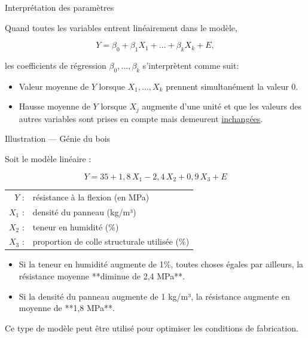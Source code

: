 \documentclass{BeamerTemplate}
\begin{document}
\begin{frame}[t]{Interprétation des paramètres}

{\small
Quand toutes les variables entrent linéairement dans le modèle,

$$Y=\beta_0+\beta_1X_1+...+\beta_kX_k+E,$$

les coefficients de régression $\beta_0,\ldots,\beta_k$ s'interprètent comme suit:
\bigskip

\begin{itemize}\itemsep1cm
\item[$\beta_0$: ] Valeur \alert{moyenne} de $Y$ lorsque $X_1,\ldots,X_k$ prennent \alert{simultanément} la valeur 0.
\item[$\beta_j$: ] Hausse \alert{moyenne} de $Y$ lorsque $X_j$ augmente d'une unité et que les
valeurs des autres variables sont prises en compte mais demeurent \underline{inchangées}.
\end{itemize}
}
\end{frame}



\begin{frame}[t]{Illustration — Génie du bois}

Soit le modèle linéaire :

$$
Y = 35 + 1{,}8\,X_1 - 2{,}4\,X_2 + 0{,}9\,X_3 + E
$$

\vspace{0.4cm}

\begin{tabular}{rl}
$Y$ : & résistance à la flexion (en MPa) \\
$X_1$ : & densité du panneau (kg/m³) \\
$X_2$ : & teneur en humidité (\%) \\
$X_3$ : & proportion de colle structurale utilisée (\%)
\end{tabular}

\vspace{0.4cm}

\begin{itemize}
\item Si la teneur en humidité augmente de 1\%, toutes choses égales par ailleurs, la résistance moyenne **diminue de 2,4 MPa**.
\item Si la densité du panneau augmente de 1 kg/m³, la résistance augmente en moyenne de **1,8 MPa**.
\end{itemize}

\vspace{0.3cm}
{\tiny Ce type de modèle peut être utilisé pour optimiser les conditions de fabrication.}
\end{frame}
\end{document}
